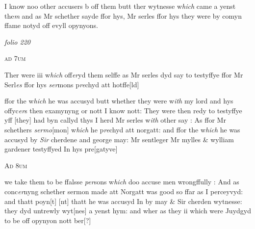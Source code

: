 \documentclass[12pt, a4paper]{book}
\begin{document}
		\ifthenelse{\isodd{\thepage}}
		{\reversemarginpar}
		{\normalmarginpar}
		I know noo other accusers b off them butt ther wytnesse w\textit{hich} came a yenst the\textit{m}
and as Mr schether sayde ffor hys, Mr serles ffor hys they were by comyn
ffame notyd off evyll opynyons. 
               
\dotfill
						\newpage
{}

\textit{folio 220}



				\begin{center} \begin{large} {\scshape ad 7um} \end{large} \end{center}
			
 	
		\ifthenelse{\isodd{\thepage}}
		{\reversemarginpar}
		{\normalmarginpar}
		Ther were iii w\textit{hich} off\textit{er}yd them selffe as Mr serles dyd say
			 to testyffye ffor Mr Serl\textit{es} ffor hys \textit{ser}mons p\textit{re}chyd att hotffe[ld]
			
 		ffor the w\textit{hich} he was accusyd butt whether they were w\textit{ith} my lord and hys offyc\textit{er}s then
 	examynyng or nott I know nott: They were then redy to testyffye yff [they]
had byn callyd thys I herd Mr serles w\textit{ith} other say : As ffor Mr schethers \textit{sermo}[mon]
w\textit{hich} he p\textit{re}chyd att norgatt: and ffor the w\textit{hich} he was accusyd by \textit{Sir} cherdene and 
george may: Mr sentleger Mr mylles \& wylliam gardener
                     	testyffyed In hys pre[gatyve]

				\begin{center} \begin{large} {\scshape Ad 8um} \end{large} \end{center}
			

		\ifthenelse{\isodd{\thepage}}
		{\reversemarginpar}
		{\normalmarginpar}
		we take them to be ffalsse \textit{per}sons w\textit{hich} doo accuse men wrongffully : And as conc\textit{er}nyng
	schether sermon made att Norgatt was good so ffar as I perceyvyd: and thatt poyn[t]
 	[nt]
 	thatt he was accusyd In by may \& Sir cherden wytnesse: they dyd untrewly wyt[nes]
a yenst hym: and wher as they ii which were Juydgyd to be off opynyon nott ber[?]
                                    
\end{document}
